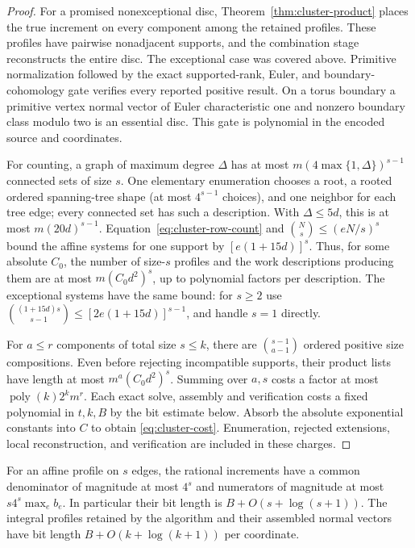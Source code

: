 \begin{proof}
For a promised nonexceptional disc, Theorem~\ref{thm:cluster-product}
places the true increment on every component among the retained
profiles.  These profiles have pairwise nonadjacent supports, and the
combination stage reconstructs the entire disc.  The exceptional case
was covered above.  Primitive normalization followed by the exact
supported-rank, Euler, and boundary-cohomology gate verifies every
reported positive result.  On a torus boundary a primitive vertex normal
vector of Euler characteristic one and nonzero boundary class modulo two
is an essential disc.  This gate is polynomial in the encoded source and
coordinates.

For counting, a graph of maximum degree $\Delta$ has at most
$m(4\max\{1,\Delta\})^{s-1}$ connected sets of size $s$.  One
elementary enumeration chooses a root, a rooted ordered spanning-tree
shape (at most $4^{s-1}$ choices), and one neighbor for each tree edge;
every connected set has such a description.  With $\Delta\le5d$, this
is at most $m(20d)^{s-1}$.  Equation~\eqref{eq:cluster-row-count} and
$\binom Ns\le(eN/s)^s$ bound the affine systems for one support by
$[e(1+15d)]^s$.  Thus, for some absolute $C_0$, the number of size-$s$
profiles and the work descriptions producing them are at most
$m(C_0d^2)^s$, up to polynomial factors per description.  The
exceptional systems have the same bound: for $s\ge2$ use
$\binom{(1+15d)s}{s-1}\le[2e(1+15d)]^{s-1}$, and handle $s=1$
directly.

For $a\le r$ components of total size $s\le k$, there are
$\binom{s-1}{a-1}$ ordered positive size compositions.  Even before
rejecting incompatible supports, their product lists have length at
most $m^a(C_0d^2)^s$.  Summing over $a,s$ costs a factor at most
$\operatorname{poly}(k)2^k m^r$.  Each exact solve, assembly and
verification costs a fixed polynomial in $t,k,B$ by the bit estimate
below.  Absorb the absolute exponential constants into $C$ to obtain
\eqref{eq:cluster-cost}.  Enumeration, rejected extensions, local
reconstruction, and verification are included in these charges.
\end{proof}

\begin{proposition}
For an affine profile on $s$ edges, the rational increments have a
common denominator of magnitude at most $4^s$ and numerators of
magnitude at most $s4^s\max_e b_e$.  In particular their bit length is
$B+O(s+\log(s+1))$.  The integral profiles retained by the algorithm and
their assembled normal vectors have bit length
$B+O(k+\log(k+1))$ per coordinate.
\end{proposition}

